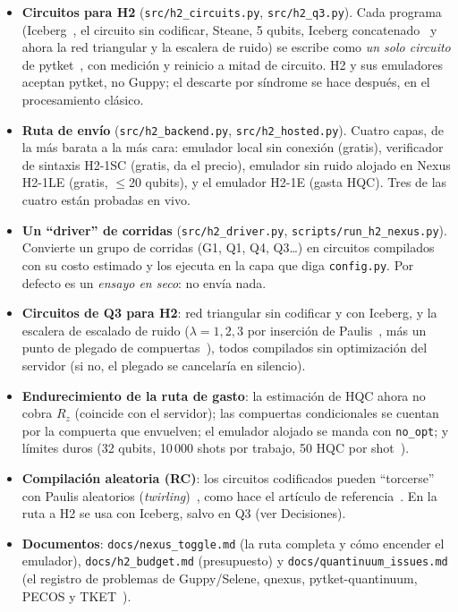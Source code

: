 \documentclass[11pt,a4paper]{article}
\newcommand{\code}[1]{\nolinkurl{#1}}
\begin{document}
\begin{itemize}[leftmargin=1.4em]
  \item \textbf{Circuitos para H2} (\code{src/h2_circuits.py}, \code{src/h2_q3.py}). Cada programa
    (Iceberg~\cite{self2024}, el circuito sin codificar, Steane, 5 qubits, Iceberg concatenado~\cite{knill2005} y ahora la red triangular
    y la escalera de ruido) se escribe como \emph{un solo circuito} de pytket~\cite{sivarajah2020}, con medici\'on y reinicio
    a mitad de circuito. H2 y sus emuladores aceptan pytket, no Guppy; el descarte por s\'indrome se hace
    despu\'es, en el procesamiento cl\'asico.
  \item \textbf{Ruta de env\'io} (\code{src/h2_backend.py}, \code{src/h2_hosted.py}). Cuatro capas, de la m\'as
    barata a la m\'as cara: emulador local sin conexi\'on (gratis), verificador de sintaxis H2-1SC (gratis, da
    el precio), emulador sin ruido alojado en Nexus H2-1LE (gratis, $\le$20 qubits), y el emulador H2-1E
    (gasta HQC). Tres de las cuatro est\'an probadas en vivo.
  \item \textbf{Un ``driver'' de corridas} (\code{src/h2_driver.py}, \code{scripts/run_h2_nexus.py}).
    Convierte un grupo de corridas (G1, Q1, Q4, Q3\ldots) en circuitos compilados con su costo estimado y los
    ejecuta en la capa que diga \texttt{config.py}. Por defecto es un \emph{ensayo en seco}: no env\'ia nada.
  \item \textbf{Circuitos de Q3 para H2}: red triangular sin codificar y con Iceberg, y la escalera de
    escalado de ruido ($\lambda=1,2,3$ por inserci\'on de Paulis~\cite{haghshenas2026}, m\'as un punto de plegado de compuertas~\cite{giurgica2020}),
    todos compilados sin optimizaci\'on del servidor (si no, el plegado se cancelar\'ia en silencio).
  \item \textbf{Endurecimiento de la ruta de gasto}: la estimaci\'on de HQC ahora no cobra $R_z$
    (coincide con el servidor); las compuertas condicionales se cuentan por la compuerta que envuelven;
    el emulador alojado se manda con \texttt{no\_opt}; y l\'imites duros (32 qubits, 10\,000 shots por
    trabajo, 50 HQC por shot~\cite{quantinuumemul,quantinuumh2}).
  \item \textbf{Compilaci\'on aleatoria (RC)}: los circuitos codificados pueden ``torcerse'' con Paulis aleatorios (\emph{twirling})~\cite{wallman2016}, como hace el art\'iculo de referencia~\cite{haghshenas2026}. En la ruta a H2 se usa con Iceberg, salvo en Q3 (ver Decisiones).
  \item \textbf{Documentos}: \code{docs/nexus_toggle.md} (la ruta completa y c\'omo encender el emulador),
    \code{docs/h2_budget.md} (presupuesto) y \code{docs/quantinuum_issues.md} (el registro de problemas de Guppy/Selene, qnexus,
    pytket-quantinuum, PECOS y TKET~\cite{qilog}).
\end{itemize}
\end{document}
